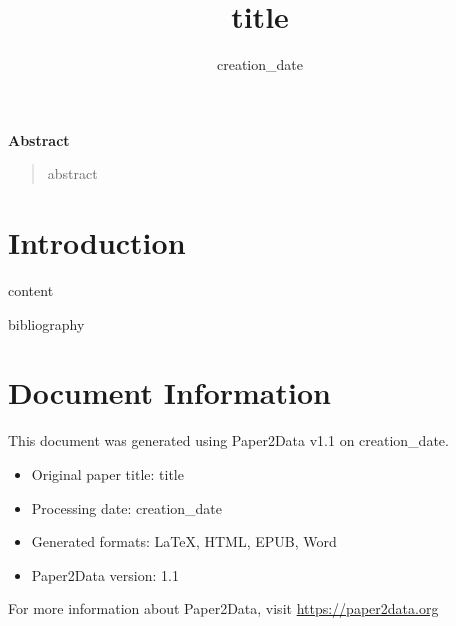 \documentclass[11pt,a4paper,oneside]{article}
\title{{{title}}}
{{authors}}
\date{{{creation_date}}}
\newenvironment{abstract}{%
    \begin{center}
        \textbf{Abstract}
    \end{center}
    \begin{quotation}
    \noindent
}{%
    \end{quotation}
}
\begin{document}
\maketitle
\thispagestyle{empty}

\begin{abstract}
{{abstract}}
\end{abstract}

\newpage
\tableofcontents
\listoffigures
\listoftables
\newpage

\section*{Introduction}

{{content}}

\newpage
{{bibliography}}

\appendix

\newpage
\section*{Document Information}

This document was generated using Paper2Data v1.1 on {{creation_date}}.

\begin{itemize}
    \item Original paper title: {{title}}
    \item Processing date: {{creation_date}}
    \item Generated formats: LaTeX, HTML, EPUB, Word
    \item Paper2Data version: 1.1
\end{itemize}

For more information about Paper2Data, visit \url{https://paper2data.org}
\end{document}
